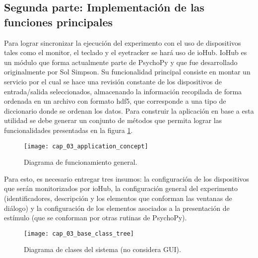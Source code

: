 \documentclass[\main/main.tex]{subfiles}
\begin{document}
	\newpage
	\subsection{Segunda parte: Implementación de las funciones principales}
	\label{sub:03_implementacion_backtend}
		Para lograr sincronizar la ejecución del experimento con el uso de dispositivos tales como el monitor, el teclado y el eyetracker se hará uso de ioHub. IoHub es un módulo que forma actualmente parte de PsychoPy y que fue desarrollado originalmente por Sol Simpson. Su funcionalidad principal consiste en montar un servicio por el cual se hace una revisión constante de los dispositivos de entrada/salida seleccionados, almacenando la información recopilada de forma ordenada en un archivo con formato hdf5, que corresponde a una tipo de diccionario donde se ordenan los datos. Para construir la aplicación en base a esta utilidad se debe generar un conjunto de métodos que permita lograr las funcionalidades presentadas en la figura \ref{fig:03_application_concept}. 
		\begin{figure}[H]
			\centering
			\texttt{[image: cap\_03\_application\_concept]}
			\caption{Diagrama de funcionamiento general.}
			\label{fig:03_application_concept}
		\end{figure} 

		Para esto, es necesario entregar tres insumos: la configuración de los dispositivos que serán monitorizados por ioHub, la configuración general del experimento (identificadores, descripción y los elementos que conforman las ventanas de diálogo) y la configuración de los elementos asociados a la presentación de estímulo (que se conforman por otras rutinas de PsychoPy). 
		\begin{figure}[H]
			\centering
			\texttt{[image: cap\_03\_base\_class\_tree]}
			\caption{Diagrama de clases del sistema (no considera GUI).}
			\label{fig:03_base_class_tree}
		\end{figure} 
\end{document}
